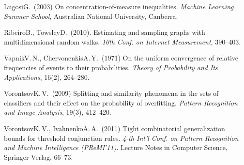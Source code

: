 \documentclass{article} %
\begin{document}
\begin{thebibliography}{00}
     Lugosi\;G.~(2003)
     On concentration-of-measure inequalities.
     \emph{Machine Learning Summer School}, Australian National University, Canberra.

    Ribeiro\;B., Towsley\;D.~(2010).
    Estimating and sampling graphs with multidimensional random walks.
    \emph{10th Conf. on Internet Measurement}, 390--403.

     Vapnik\;V.\,N., Chervonenkis\;A.\,Y.~(1971)
     On the uniform convergence of relative frequencies of events to their probabilities.
     \emph{Theory of Probability and Its Applications}, 16(2), 264--280.

    Vorontsov\;K.\,V.~(2009)
    Splitting and similarity phenomena in the sets of classifiers and their effect on the probability of overfitting.
    \emph{Pattern Recognition and Image Analysis}, 19(3), 412--420.

    Vorontsov\;K.\,V., Ivahnenko\;A.\,A.~(2011)
    Tight combinatorial generalization bounds for threshold conjunction rules.
    \emph{4-th Int'l Conf. on Pattern Recognition and Machine Intelligence (PReMI'11)}.
    Lecture Notes in Computer Science, Springer-Verlag, 66--73.

\end{thebibliography}
\end{document}
